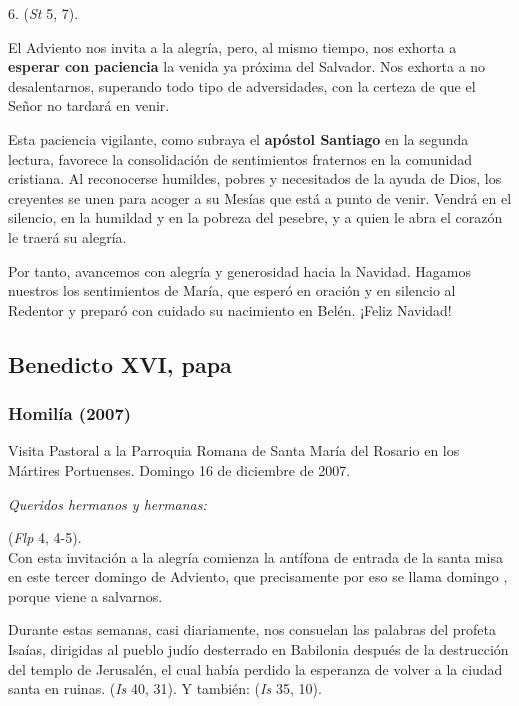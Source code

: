 \begin{body}
\begin{body}
6.  (\emph{St} 5, 7).

El Adviento nos invita a la alegría, pero, al mismo tiempo, nos exhorta a \textbf{esperar con paciencia} la venida ya próxima del Salvador. Nos exhorta a no desalentarnos, superando todo tipo de adversidades, con la certeza de que el Señor no tardará en venir.

Esta paciencia vigilante, como subraya el \textbf{apóstol Santiago} en la segunda lectura, favorece la consolidación de sentimientos fraternos en la comunidad cristiana. Al reconocerse humildes, pobres y necesitados de la ayuda de Dios, los creyentes se unen para acoger a su Mesías que está a punto de venir. Vendrá en el silencio, en la humildad y en la pobreza del pesebre, y a quien le abra el corazón le traerá su alegría.

Por tanto, avancemos con alegría y generosidad hacia la Navidad. Hagamos nuestros los sentimientos de María, que esperó en oración y en silencio al Redentor y preparó con cuidado su nacimiento en Belén. ¡Feliz Navidad!

\subsection{Benedicto XVI, papa}

\subsubsection{Homilía (2007)} 

Visita Pastoral a la Parroquia Romana de Santa María del Rosario en los Mártires Portuenses. Domingo 16 de diciembre de 2007.

\emph{Queridos hermanos y hermanas:}

 (\emph{Flp} 4, 4-5).\\ Con esta invitación a la alegría comienza la antífona de entrada de la santa misa en este tercer domingo de Adviento, que precisamente por eso se llama domingo , porque viene a salvarnos.

Durante estas semanas, casi diariamente, nos consuelan las palabras del profeta Isaías, dirigidas al pueblo judío desterrado en Babilonia después de la destrucción del templo de Jerusalén, el cual había perdido la esperanza de volver a la ciudad santa en ruinas.  (\emph{Is} 40, 31). Y también:  (\emph{Is} 35, 10).


\end{body}
\end{body}
